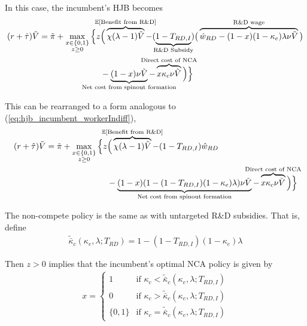 \documentclass[11pt,english]{article}
\theoremstyle{remark}
\begin{document}
In this case, the incumbent's HJB becomes
\begin{align}
(r + \hat{\tau}) \tilde{V} = \tilde{\pi} + \max_{\substack{x \in \{0,1\} \\ z \ge 0}} \Big\{z &\Big( \overbrace{\chi (\lambda - 1) \tilde{V}}^{\mathclap{\mathbb{E}[\textrm{Benefit from R\&D}]}}- (\underbrace{1-T_{RD,I}}_{\mathclap{\text{R\&D Subsidy}}}) \big( \overbrace{\hat{w}_{RD} - (1-x)(1-\kappa_e)\lambda \nu \tilde{V}}^{\mathclap{\text{R\&D wage}}}\big) \label{eq:hjb_incumbent_RDsubsidyTargeted} \nonumber \\ 
&-  \underbrace{(1-x) \nu \tilde{V}}_{\mathclap{\text{Net cost from spinout formation}}} - \overbrace{x \kappa_{c} \nu \tilde{V}}^{\mathclap{\text{Direct cost of NCA}}}\Big) \Big\} 
\end{align}

This can be rearranged to a form analogous to (\ref{eq:hjb_incumbent_workerIndiff}),
\begin{align}
(r + \hat{\tau}) \tilde{V} = \tilde{\pi} + \max_{\substack{x \in \{0,1\} \\ z \ge 0}} \Big\{z &\Big( \overbrace{\chi (\lambda - 1) \tilde{V}}^{\mathclap{\mathbb{E}[\textrm{Benefit from R\&D}]}}- (1-T_{RD,I}) \hat{w}_{RD} \\
&-  \underbrace{(1-x)(1 - (1-T_{RD,I})(1-\kappa_{e})\lambda)\nu \tilde{V}}_{\mathclap{\text{Net cost from spinout formation}}} - \overbrace{x \kappa_{c} \nu \tilde{V}}^{\mathclap{\text{Direct cost of NCA}}}\Big) \Big\} \label{eq:hjb_incumbent_RDsubsidyTargeted_2}
\end{align}

The non-compete policy is the same as with untargeted R\&D subsidies. That is, define
\begin{align}
\tilde{\bar{\kappa}}_c(\kappa_e,\lambda;T_{RD}) = 1 - (1-T_{RD,I})(1-\kappa_e)\lambda
\end{align} 

Then $z > 0$ implies that the incumbent's optimal NCA policy is given by 
\begin{align}
x = \begin{cases}
1 & \textrm{if } \kappa_{c} < \tilde{\bar{\kappa}}_c (\kappa_e, \lambda;T_{RD,I}) \\
0 & \textrm{if } \kappa_{c} > \tilde{\bar{\kappa}}_c (\kappa_e, \lambda;T_{RD,I})\\
\{0,1\} & \textrm{if } \kappa_c = \tilde{\bar{\kappa}}_c (\kappa_e, \lambda;T_{RD,I})
\end{cases} \label{eq:nca_policy_RDsubsidyTargeted}
\end{align}
\end{document}
